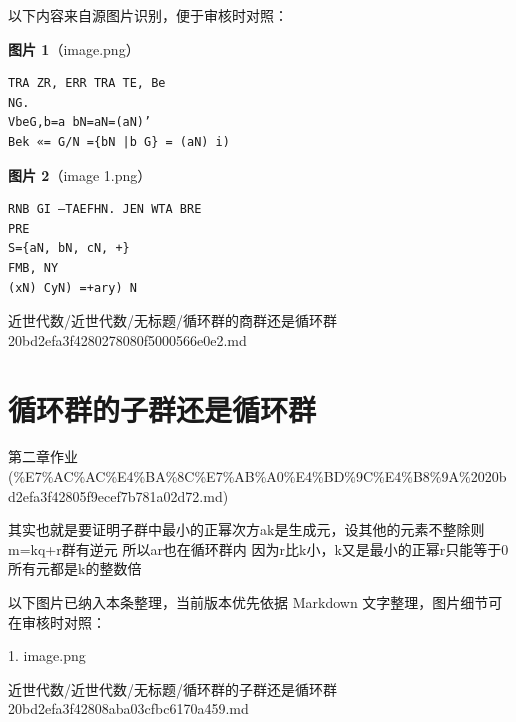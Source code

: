 \begin{note}
以下内容来自源图片识别，便于审核时对照：

\textbf{图片 1}（image.png）
\begin{Verbatim}[fontsize=\small]
% G=(a) Hr N<G
TRA ZR, ERR TRA TE, Be
NG.
VbeG,b=a bN=aN=(aN)’
Bek «= G/N ={bN |b G} = (aN) i)
\end{Verbatim}

\textbf{图片 2}（image 1.png）
\begin{Verbatim}[fontsize=\small]
RNB GI —TAEFHN. JEN WTA BRE
PRE
S={aN, bN, cN, +}
FMB, NY
(xN) CyN) =+ary) N
\end{Verbatim}

\end{note}

\begin{note}[来源路径]

近世代数/近世代数/无标题/循环群的商群还是循环群 20bd2efa3f4280278080f5000566e0e2.md

\end{note}

\section*{循环群的子群还是循环群}

\begin{note}[来源上级主题]

第二章作业 (\%E7\%AC\%AC\%E4\%BA\%8C\%E7\%AB\%A0\%E4\%BD\%9C\%E4\%B8\%9A\%2020bd2efa3f42805f9ecef7b781a02d72.md)

\end{note}

\begin{homework}

其实也就是要证明子群中最小的正幂次方ak是生成元，设其他的元素不整除则m=kq+r群有逆元 所以ar也在循环群内 因为r比k小，k又是最小的正幂r只能等于0所有元都是k的整数倍

\end{homework}

\begin{note}[关联图片]
以下图片已纳入本条整理，当前版本优先依据 Markdown 文字整理，图片细节可在审核时对照：

1. image.png\\

\end{note}

\begin{note}[来源路径]

近世代数/近世代数/无标题/循环群的子群还是循环群 20bd2efa3f42808aba03cfbc6170a459.md

\end{note}

